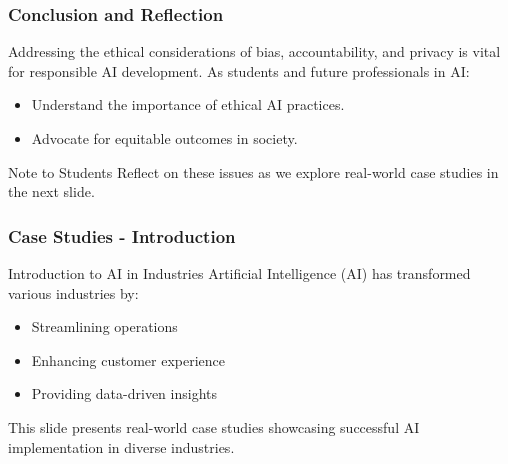 \documentclass[aspectratio=169]{beamer}
\begin{document}
\begin{frame}[fragile]
    \frametitle{Conclusion and Reflection}
    Addressing the ethical considerations of bias, accountability, and privacy is vital for responsible AI development. 
    As students and future professionals in AI:
    \begin{itemize}
        \item Understand the importance of ethical AI practices.
        \item Advocate for equitable outcomes in society.
    \end{itemize}
    \begin{block}{Note to Students}
        Reflect on these issues as we explore real-world case studies in the next slide.
    \end{block}
\end{frame}

\begin{frame}[fragile]
    \frametitle{Case Studies - Introduction}
    \begin{block}{Introduction to AI in Industries}
        Artificial Intelligence (AI) has transformed various industries by:
        \begin{itemize}
            \item Streamlining operations
            \item Enhancing customer experience
            \item Providing data-driven insights
        \end{itemize}
        This slide presents real-world case studies showcasing successful AI implementation in diverse industries.
    \end{block}
\end{frame}
\end{document}
